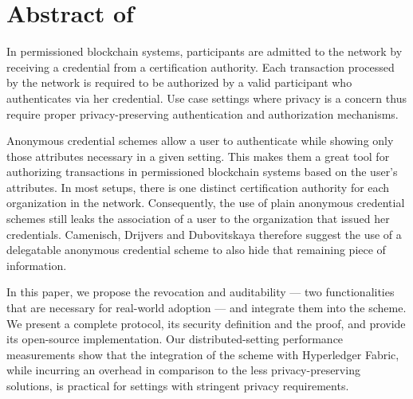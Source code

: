 

\chapter{Abstract of \cite{bogatov-idemix-2020}}\label{section:appendix:idemix-abstract}
\thispagestyle{myheadings}

	In permissioned blockchain systems, participants are admitted to the network by receiving a credential from a certification authority.
	Each transaction processed by the network is required to be authorized by a valid participant who authenticates via her credential.
	Use case settings where privacy is a concern thus require proper privacy-preserving authentication and authorization mechanisms.

	Anonymous credential schemes allow a user to authenticate while showing only those attributes necessary in a given setting.
	This makes them a great tool for authorizing transactions in permissioned blockchain systems based on the user's attributes.
	In most setups, there is one distinct certification authority for each organization in the network.
	Consequently, the use of plain anonymous credential schemes still leaks the association of a user to the organization that issued her credentials.
	Camenisch, Drijvers and Dubovitskaya \cite{delegatable-creds} therefore suggest the use of a delegatable anonymous credential scheme to also hide that remaining piece of information.

	In this paper, we propose the revocation and auditability --- two functionalities that are necessary for real-world adoption --- and integrate them into the scheme.
	We present a complete protocol, its security definition and the proof, and provide its open-source implementation.
	Our distributed-setting performance measurements show that the integration of the scheme with Hyperledger Fabric, while incurring an overhead in comparison to the less privacy-preserving solutions, is practical for settings with stringent privacy requirements.
